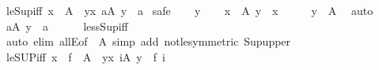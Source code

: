 \begin{isabellebody}
%
\endisadelimproof
\isanewline
{}\isamarkupfalse%
\ le{\isacharunderscore}{\kern0pt}Sup{\isacharunderscore}{\kern0pt}iff{\isacharcolon}{\kern0pt}\ {\isachardoublequoteopen}x\ {\isasymle}\ {\isasymSqunion}A\ {\isasymlongleftrightarrow}\ {\isacharparenleft}{\kern0pt}{\isasymforall}y{\isacharless}{\kern0pt}x{\isachardot}{\kern0pt}\ {\isasymexists}a{\isasymin}A{\isachardot}{\kern0pt}\ y\ {\isacharless}{\kern0pt}\ a{\isacharparenright}{\kern0pt}{\isachardoublequoteclose}\isanewline
%
\isadelimproof
%
\endisadelimproof
%
\isatagproof
{}\isamarkupfalse%
\ safe\isanewline
\ \ \isamarkupfalse%
\ y\isanewline
\ \ \isamarkupfalse%
\ {\isachardoublequoteopen}x\ {\isasymle}\ {\isasymSqunion}A{\isachardoublequoteclose}\ {\isachardoublequoteopen}y\ {\isacharless}{\kern0pt}\ x{\isachardoublequoteclose}\isanewline
\ \ \isamarkupfalse%
\ \isamarkupfalse%
\ {\isachardoublequoteopen}y\ {\isacharless}{\kern0pt}\ {\isasymSqunion}A{\isachardoublequoteclose}\ \isamarkupfalse%
\ auto\isanewline
\ \ \isamarkupfalse%
\ \isamarkupfalse%
\ {\isachardoublequoteopen}{\isasymexists}a{\isasymin}A{\isachardot}{\kern0pt}\ y\ {\isacharless}{\kern0pt}\ a{\isachardoublequoteclose}\isanewline
\ \ \ \ \isamarkupfalse%
\ less{\isacharunderscore}{\kern0pt}Sup{\isacharunderscore}{\kern0pt}iff\ \isacommand{{\isachardot}{\kern0pt}}\isamarkupfalse%
\isanewline
{}\isamarkupfalse%
\ {\isacharparenleft}{\kern0pt}auto\ elim{\isacharbang}{\kern0pt}{\isacharcolon}{\kern0pt}\ allE{\isacharbrackleft}{\kern0pt}of\ {\isacharunderscore}{\kern0pt}\ {\isachardoublequoteopen}{\isasymSqunion}A{\isachardoublequoteclose}{\isacharbrackright}{\kern0pt}\ simp\ add{\isacharcolon}{\kern0pt}\ not{\isacharunderscore}{\kern0pt}le{\isacharbrackleft}{\kern0pt}symmetric{\isacharbrackright}{\kern0pt}\ Sup{\isacharunderscore}{\kern0pt}upper{\isacharparenright}{\kern0pt}%
\endisatagproof
{\isafoldproof}%
%
\isadelimproof
\isanewline
%
\endisadelimproof
\isanewline
{}\isamarkupfalse%
\ le{\isacharunderscore}{\kern0pt}SUP{\isacharunderscore}{\kern0pt}iff{\isacharcolon}{\kern0pt}\ {\isachardoublequoteopen}x\ {\isasymle}\ {\isasymSqunion}{\isacharparenleft}{\kern0pt}f\ {\isacharbackquote}{\kern0pt}\ A{\isacharparenright}{\kern0pt}\ {\isasymlongleftrightarrow}\ {\isacharparenleft}{\kern0pt}{\isasymforall}y{\isacharless}{\kern0pt}x{\isachardot}{\kern0pt}\ {\isasymexists}i{\isasymin}A{\isachardot}{\kern0pt}\ y\ {\isacharless}{\kern0pt}\ f\ i{\isacharparenright}{\kern0pt}{\isachardoublequoteclose}\isanewline

\end{isabellebody}
